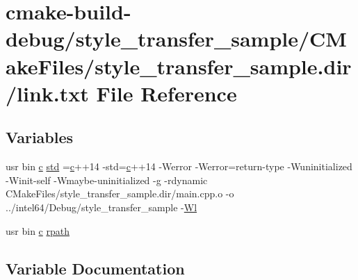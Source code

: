 \hypertarget{style__transfer__sample_2CMakeFiles_2style__transfer__sample_8dir_2link_8txt}{}\section{cmake-\/build-\/debug/style\+\_\+transfer\+\_\+sample/\+C\+Make\+Files/style\+\_\+transfer\+\_\+sample.dir/link.txt File Reference}
\label{style__transfer__sample_2CMakeFiles_2style__transfer__sample_8dir_2link_8txt}
\subsection*{Variables}
\begin{DoxyCompactItemize}
\item 
usr bin \hyperlink{CMakeCache_8txt_aac1d6a1710812201527c735f7c6afbaa}{c} \hyperlink{style__transfer__sample_2CMakeFiles_2style__transfer__sample_8dir_2link_8txt_a1ccfea5f558575a112db71eeb271fabf}{std} =\hyperlink{CMakeCache_8txt_aac1d6a1710812201527c735f7c6afbaa}{c}++14 -\/std=\hyperlink{CMakeCache_8txt_aac1d6a1710812201527c735f7c6afbaa}{c}++14 -\/Werror -\/Werror=return-\/type -\/Wuninitialized -\/Winit-\/self -\/Wmaybe-\/uninitialized -\/g -\/rdynamic C\+Make\+Files/style\+\_\+transfer\+\_\+sample.\+dir/main.\+cpp.\+o -\/o ../intel64/Debug/style\+\_\+transfer\+\_\+sample -\/\hyperlink{thirdparty_2extension_2CMakeFiles_2cpu__extension_8dir_2link_8txt_af9ccbf658ed2deb89d0d79f211e5b033}{Wl}
\item 
usr bin \hyperlink{CMakeCache_8txt_aac1d6a1710812201527c735f7c6afbaa}{c} \hyperlink{style__transfer__sample_2CMakeFiles_2style__transfer__sample_8dir_2link_8txt_ab9d7fd7120fafa2118a4e08c1df697c7}{rpath}
\end{DoxyCompactItemize}


\subsection{Variable Documentation}
